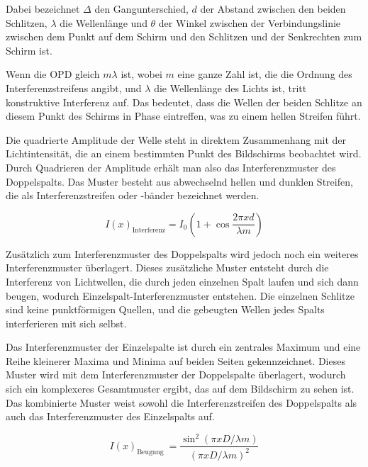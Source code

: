 \documentclass[12pt,english,ngerman]{scrartcl}
\begin{document}

Dabei bezeichnet $\Delta$ den Gangunterschied, $d$ der Abstand zwischen den
beiden Schlitzen, $\lambda$ die Wellenlänge und $\theta$ der Winkel zwischen
der Verbindungslinie zwischen dem Punkt auf dem Schirm und den Schlitzen und
der Senkrechten zum Schirm ist.

Wenn die OPD gleich $m \lambda$ ist, wobei $m$ eine ganze Zahl ist, die die
Ordnung des Interferenzstreifens angibt, und $\lambda$ die Wellenlänge des
Lichts ist, tritt konstruktive Interferenz auf. Das bedeutet, dass die Wellen
der beiden Schlitze an diesem Punkt des Schirms in Phase eintreffen, was zu
einem hellen Streifen führt.

Die quadrierte Amplitude der Welle steht in direktem Zusammenhang mit der
Lichtintensität, die an einem bestimmten Punkt des Bildschirms beobachtet wird.
Durch Quadrieren der Amplitude erhält man also das Interferenzmuster des
Doppelspalts. Das Muster besteht aus abwechselnd hellen und dunklen Streifen,
die als Interferenzstreifen oder -bänder bezeichnet werden.

\begin{equation}
	I(x)_{\text {Interferenz}}=I_0\left(1+\cos \frac{2 \pi x d}{\lambda m}\right)
	\label{eq:InterferenzDoppelSpalt}
\end{equation}

Zusätzlich zum Interferenzmuster des Doppelspalts wird jedoch noch ein weiteres
Interferenzmuster überlagert. Dieses zusätzliche Muster entsteht durch die
Interferenz von Lichtwellen, die durch jeden einzelnen Spalt laufen und sich
dann beugen, wodurch Einzelspalt-Interferenzmuster entstehen. Die einzelnen
Schlitze sind keine punktförmigen Quellen, und die gebeugten Wellen jedes
Spalts interferieren mit sich selbst.

Das Interferenzmuster der Einzelspalte ist durch ein zentrales Maximum und eine
Reihe kleinerer Maxima und Minima auf beiden Seiten gekennzeichnet. Dieses
Muster wird mit dem Interferenzmuster der Doppelspalte überlagert, wodurch sich
ein komplexeres Gesamtmuster ergibt, das auf dem Bildschirm zu sehen ist. Das
kombinierte Muster weist sowohl die Interferenzstreifen des Doppelspalts als
auch das Interferenzmuster des Einzelspalts auf.

\begin{equation}
	I(x)_{\text {Beugung }}=\frac{\sin ^2(\pi x D / \lambda m)}{(\pi x D / \lambda m)^2}
	\label{eq:InterferenzEinzelspalt}
\end{equation}
\end{document}
